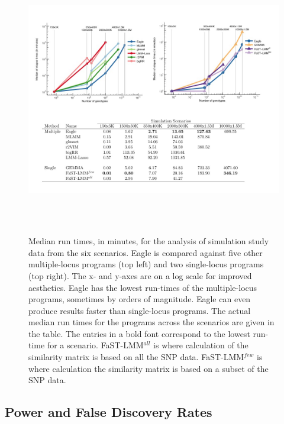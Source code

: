 \documentclass{article}
\begin{document}
 
\begin{figure}
\caption{Median run times, in minutes, for the analysis of simulation study data from the six scenarios. 
Eagle is compared against five other multiple-locus programs (top left) and two single-locus programs (top right). 
The x- and y-axes are on a log scale for improved aesthetics. Eagle has the lowest run-times of the multiple-locus 
programs, sometimes by orders of magnitude. Eagle can even produce results faster than single-locus programs. 
The actual median run times for the programs across the scenarios are given in the table. The entries in a bold font 
correspond to the lowest run-time for a scenario. 
 FaST-LMM$^{all}$ is where calculation of the similarity matrix is based on all the SNP data.  
 FaST-LMM$^{few}$ is where calculation  the similarity matrix is based on a subset of the SNP data. }

\label{fig_time}
\begin{center}
\includegraphics[width=14cm, height=12cm]{Figure2_time.jpg}
\end{center}

\end{figure}

 
 





\subsection{Power and False Discovery Rates}
\end{document}
